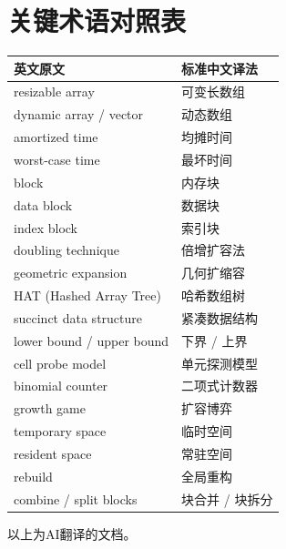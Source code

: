 \documentclass[11pt,a4paper]{article}
\begin{document}
\vspace{2em}
\section{关键术语对照表}
\begin{tabularx}{\linewidth}{|l|X|}
    \hline
    英文原文 & 标准中文译法 \\
    \hline
    resizable array & 可变长数组 \\
    dynamic array / vector & 动态数组 \\
    amortized time & 均摊时间 \\
    worst-case time & 最坏时间 \\
    block & 内存块 \\
    data block & 数据块 \\
    index block & 索引块 \\
    doubling technique & 倍增扩容法 \\
    geometric expansion & 几何扩缩容 \\
    HAT (Hashed Array Tree) & 哈希数组树 \\
    succinct data structure & 紧凑数据结构 \\
    lower bound / upper bound & 下界 / 上界 \\
    cell probe model & 单元探测模型 \\
    binomial counter & 二项式计数器 \\
    growth game & 扩容博弈 \\
    temporary space & 临时空间 \\
    resident space & 常驻空间 \\
    rebuild & 全局重构 \\
    combine / split blocks & 块合并 / 块拆分 \\
    \hline
\end{tabularx}
以上为AI翻译的文档。
\end{document}
